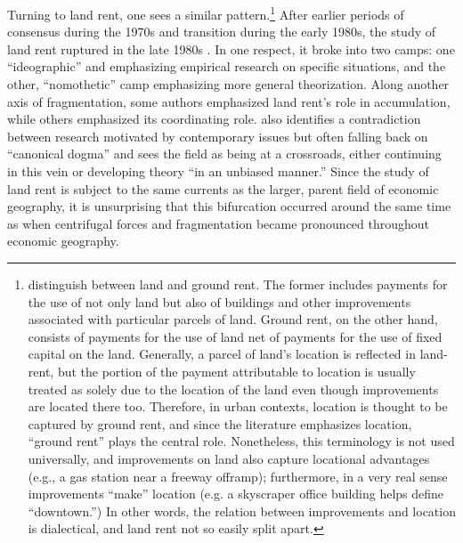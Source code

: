 Turning to land rent, one sees a similar pattern.\footnote{\citet{ward2016theshitty}distinguish between land and ground rent.
The former includes payments for the use of not only land but also
of buildings and other improvements associated with particular parcels
of land. Ground rent, on the other hand, consists of payments for
the use of land net of payments for the use of fixed capital on the
land. Generally, a parcel of land's location is reflected in land-rent,
but the portion of the payment attributable to location is usually
treated as solely due to the location of the land even though improvements
are located there too. Therefore, in urban contexts, location is thought
to be captured by ground rent, and since the literature emphasizes
location, ``ground rent'' plays the central role. Nonetheless, this
terminology is not used universally, and improvements on land also
capture locational advantages (e.g., a gas station near a freeway
offramp); furthermore, in a very real sense improvements ``make''
location (e.g. a skyscraper office building helps define ``downtown.'')
In other words, the relation between improvements and location is
dialectical, and land rent not so easily split apart.} After earlier periods of consensus during the 1970s and transition
during the early 1980s, the study of land rent ruptured in the late
1980s \citep{haila1990thetheory}. In one respect, it broke into two
camps: one ``ideographic'' and emphasizing empirical research on
specific situations, and the other, ``nomothetic'' camp emphasizing
more general theorization. Along another axis of fragmentation, some
authors emphasized land rent's role in accumulation, while others
emphasized its coordinating role. \citet[276]{haila1990thetheory}
also identifies a contradiction between research motivated by contemporary
issues but often falling back on ``canonical dogma'' and sees the
field as being at a crossroads, either continuing in this vein or
developing theory ``in an unbiased manner.'' Since the study of
land rent is subject to the same currents as the larger, parent field
of economic geography, it is unsurprising that this bifurcation occurred
around the same time as when centrifugal forces and fragmentation
became pronounced throughout economic geography.

